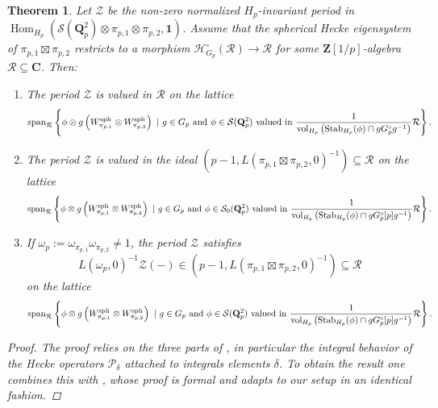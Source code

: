 \documentclass{amsart}%
\theoremstyle{plain}
\newtheorem{thm}{Theorem}[subsection]
\newcommand\scalemath[2]{\scalebox{#1}{\mbox{\ensuremath{\displaystyle #2}}}}
\theoremstyle{plain}
\theoremstyle{remark}
\DeclareMathOperator{\Hom}{Hom}
\DeclareMathOperator{\vol}{vol}
\begin{document}
\begin{thm}\label{thm integral JPSS periods}
    Let $\mathcal{Z}$ be the non-zero normalized $H_p$-invariant period in $\Hom_{H_p}(\mathcal{S}(\mathbf{Q}_p^2)\otimes \pi_{p,1}\otimes \pi_{p,2},\mathbf{1})$. Assume that the spherical Hecke eigensystem of $\pi_{p,1}\boxtimes \pi_{p,2}$ restricts to a morphism $\mathcal{H}_{G_p}^\circ(\mathcal{R})\rightarrow\mathcal{R}$ for some $\mathbf{Z}[1/p]$-algebra $\mathcal{R}\subseteq\mathbf{C}$. Then:
    \begin{enumerate}
        \item The period $\mathcal{Z}$ is valued in $\mathcal{R}$ on the lattice 
        \begin{align*}
           \scalemath{0.9}{ \mathrm{span}_{\mathcal{R}}\left\{\phi\otimes g\left(W_{\pi_{p,1}}^\mathrm{sph}\otimes W_{\pi_{p,2}}^\mathrm{sph}\right)\ |\ g\in G_p\ \mathrm{and}\ \phi\in\mathcal{S}(\mathbf{Q}_p^2)\ \mathrm{valued}\ \mathrm{in}\ \frac{1}{\vol_{H_p}\left(\mathrm{Stab}_{H_p}(\phi)\cap g G_p^\circ g^{-1}\right)}\mathcal{R}\right\}.}
        \end{align*}
        \item The period $\mathcal{Z}$ is valued in the ideal $\left(p-1,L(\pi_{p,1}\boxtimes \pi_{p,2},0)^{-1}\right)\subseteq\mathcal{R}$ on the lattice 
        \begin{align*}
           \scalemath{0.9}{ \mathrm{span}_{\mathcal{R}}\left\{\phi\otimes g\left(W_{\pi_{p,1}}^\mathrm{sph}\otimes W_{\pi_{p,2}}^\mathrm{sph}\right)\ |\ g\in G_p\ \mathrm{and}\ \phi\in\mathcal{S}_0(\mathbf{Q}_p^2)\ \mathrm{valued}\ \mathrm{in}\ \frac{1}{\vol_{H_p}\left(\mathrm{Stab}_{H_p}(\phi)\cap g G_p^\circ[p] g^{-1}\right)}\mathcal{R}\right\}.}
        \end{align*}
        \item If $\omega_p:=\omega_{\pi_{p,1}}\omega_{\pi_{p,2}}\neq 1$, the period $\mathcal{Z}$ satisfies
        $$L(\omega_p,0)^{-1}\mathcal{Z}(-)\in \left(p-1,L(\pi_{p,1}\boxtimes \pi_{p,2},0)^{-1}\right)\subseteq\mathcal{R}$$
        on the lattice
        \begin{align*}
           \scalemath{0.9}{ \mathrm{span}_{\mathcal{R}}\left\{\phi\otimes g\left(W_{\pi_{p,1}}^\mathrm{sph}\otimes W_{\pi_{p,2}}^\mathrm{sph}\right)\ |\ g\in G_p\ \mathrm{and}\ \phi\in\mathcal{S}(\mathbf{Q}_p^2)\ \mathrm{valued}\ \mathrm{in}\ \frac{1}{\vol_{H_p}\left(\mathrm{Stab}_{H_p}(\phi)\cap g G_p^\circ[p] g^{-1}\right)}\mathcal{R}\right\}.}
        \end{align*}
    \end{enumerate}
    \begin{proof}
        The proof relies on the three parts of , in particular the integral behavior of the Hecke operators $\mathcal{P}_\delta$ attached to integrals elements $\delta$. To obtain the result one combines this with \cite[Proposition $4.4.1$]{Loeffler_2021}, whose proof is formal and adapts to our setup in an identical fashion. 
    \end{proof}
\end{thm}
\end{document}
